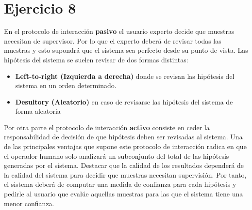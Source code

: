 \documentclass[10pt,a4paper]{article}
\begin{document}
	\section{Ejercicio 8}
	En el protocolo de interacción \textbf{pasivo} el usuario experto decide que muestras
	necesitan de supervisor. Por lo que el experto deberá de revisar todas las
	muestras y esto supondrá que el sistema sea perfecto desde su punto de vista.
	Las hipótesis del sistema se suelen revisar de dos formas distintas:
	\begin{itemize}
		\item \textbf{Left-to-right (Izquierda a derecha)} donde se revisan las hipótesis del
		sistema en un orden determinado.
		\item \textbf{Desultory (Aleatorio)} en caso de revisarse las hipótesis del sistema de forma aleatoria
	\end{itemize}
	Por otra parte el protocolo de interacción \textbf{activo} consiste en ceder la responsabilidad de decisión de que hipótesis deben ser revisadas al sistema. Una de las principales ventajas que supone este protocolo de interacción radica en que el operador humano solo analizará un subconjunto del total de las hipótesis generadas por el sistema. Destacar que la calidad de los resultados dependerá de la calidad del sistema para decidir que muestras necesitan supervisión. Por tanto, el sistema deberá de computar una medida de confianza para cada hipótesis y pedirle al usuario que evalúe aquellas muestras para las que el sistema tiene una menor confianza.
	
	
\end{document}
